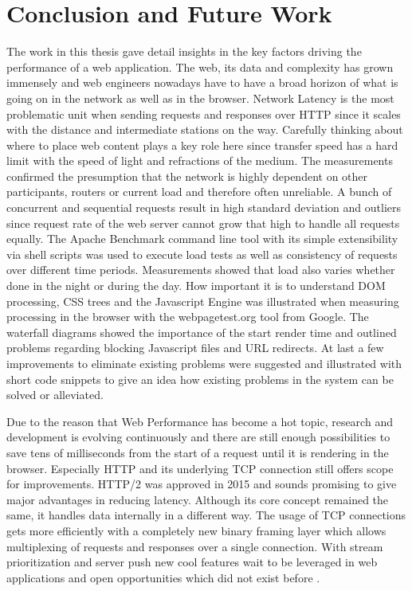 \chapter{Conclusion and Future Work}
\label{chap:conclusion}

The work in this thesis gave detail insights in the key factors driving the performance of a web application. The web, its data and complexity has grown immensely and web engineers nowadays have to have a broad horizon of what is going on in the network as well as in the browser. Network Latency is the most problematic unit when sending requests and responses over HTTP since it scales with the distance and intermediate stations on the way. Carefully thinking about where to place web content plays a key role here since transfer speed has a hard limit with the speed of light and refractions of the medium. The measurements confirmed the presumption that the network is highly dependent on other participants, routers or current load and therefore often unreliable. A bunch of concurrent and sequential requests result in high standard deviation and outliers since request rate of the web server cannot grow that high to handle all requests equally. The Apache Benchmark command line tool with its simple extensibility via shell scripts was used to execute load tests as well as consistency of requests over different time periods. Measurements showed that load also varies whether done in the night or during the day. How important it is to understand DOM processing, CSS trees and the Javascript Engine was illustrated when measuring processing in the browser with the webpagetest.org tool from Google. The waterfall diagrams showed the importance of the start render time and outlined problems regarding blocking Javascript files and URL redirects. At last a few improvements to eliminate existing problems were suggested and illustrated with short code snippets to give an idea how existing problems in the system can be solved or alleviated.

Due to the reason that Web Performance has become a hot topic, research and development is evolving continuously and there are still enough possibilities to save tens of milliseconds from the start of a request until it is rendering in the browser. Especially HTTP and its underlying TCP connection still offers scope for improvements. HTTP/2 was approved in 2015 and sounds promising to give major advantages in reducing latency. Although its core concept remained the same, it handles data internally in a different way. The usage of TCP connections gets more efficiently with a completely new binary framing layer which allows multiplexing of requests and responses over a single connection. With stream prioritization and server push new cool features wait to be leveraged in web applications and open opportunities which did not exist before \cite{Grigorik_2015}.


